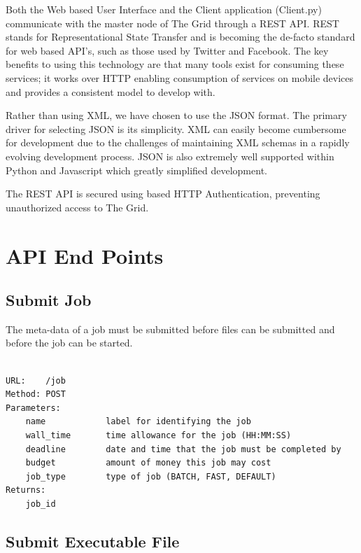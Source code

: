 Both the Web based User Interface and the Client application (Client.py) communicate with the master node of The Grid through a REST API. REST stands for Representational State Transfer and is becoming the de-facto standard for web based API's, such as those used by Twitter and Facebook. The key benefits to using this technology are that many tools exist for consuming these services; it works over HTTP enabling consumption of services on mobile devices and provides a consistent model to develop with.

Rather than using XML, we have chosen to use the JSON format. The primary driver for selecting JSON is its simplicity. XML can easily become cumbersome for development due to the challenges of maintaining XML schemas in a rapidly evolving development process. JSON is also extremely well supported within Python and Javascript which greatly simplified development.

The REST API is secured using based HTTP Authentication, preventing unauthorized access to The Grid.

\section{API End Points}
\label{apiendpoints}

\subsection{Submit Job}
\label{submitjob}

The meta-data of a job must be submitted before files can be submitted and before the job can be started.

\begin{adjustwidth}{2.5em}{2.5em}
\begin{verbatim}

URL:    /job
Method: POST
Parameters: 
    name            label for identifying the job
    wall_time       time allowance for the job (HH:MM:SS)
    deadline        date and time that the job must be completed by
    budget          amount of money this job may cost
    job_type        type of job (BATCH, FAST, DEFAULT)
Returns:    
    job_id

\end{verbatim}
\end{adjustwidth}

\subsection{Submit Executable File}
\label{submitexecutablefile}

